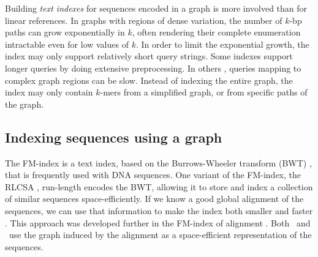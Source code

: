 Building \emph{text indexes} for sequences encoded in a graph is more involved than for linear references.
In graphs with regions of dense variation, the number of $k$-bp paths can grow exponentially in $k$, often rendering their complete enumeration intractable even for low values of $k$.
In order to limit the exponential growth, the index may only support relatively short query strings.
Some indexes \cite{Siren_2014} support longer queries by doing extensive preprocessing.
In others \cite{Thachuk_2013,Huang_2013,Maciuca_2016}, queries mapping to complex graph regions can be slow.
Instead of indexing the entire graph, the index may only contain $k$-mers from a simplified graph, or from specific paths of the graph.

\subsection{Indexing sequences using a graph}

The FM-index \cite{Ferragina_2005} is a text index, based on the Burrows-Wheeler transform (BWT) \cite{Burrows_1994}, that is frequently used with DNA sequences.
One variant of the FM-index, the RLCSA \cite{Maekinen_2010}, run-length encodes the BWT, allowing it to store and index a collection of similar sequences space-efficiently.
If we know a good global alignment of the sequences, we can use that information to make the index both smaller and faster \cite{Huang_2010}.
This approach was developed further in the FM-index of alignment \cite{Na_2016,Na_2018}.
Both \cite{Huang_2010}\ and \citep{Na_2016}\ use the graph induced by the alignment as a space-efficient representation of the sequences.

